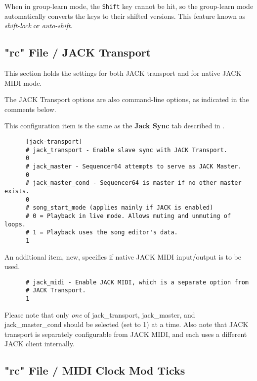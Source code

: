    When in group-learn mode, the \texttt{Shift} key cannot be hit, so the
   group-learn mode automatically converts the keys to their shifted versions.
   This feature known as \textsl{shift-lock} or \textsl{auto-shift}.

\subsection{"rc" File / JACK Transport}
\label{subsec:seq64_rc_file_jack_transport}

   This section holds the settings for both JACK transport and for native JACK
   MIDI mode.

   The JACK Transport options are also command-line options, as indicated in
   the comments below.

   This configuration item is the same as the 
   \textbf{Jack Sync} tab described in
   .

   \begin{verbatim}
      [jack-transport]
      # jack_transport - Enable slave sync with JACK Transport.
      0
      # jack_master - Sequencer64 attempts to serve as JACK Master.
      0
      # jack_master_cond - Sequencer64 is master if no other master exists.
      0
      # song_start_mode (applies mainly if JACK is enabled)
      # 0 = Playback in live mode. Allows muting and unmuting of loops.
      # 1 = Playback uses the song editor's data.
      1
   \end{verbatim}

   An additional item, new, specifies if native JACK MIDI input/output is to be
   used.

   \begin{verbatim}
      # jack_midi - Enable JACK MIDI, which is a separate option from
      # JACK Transport.
      1
   \end{verbatim}

   Please note that only \textsl{one} of
   jack\_transport, jack\_master, and jack\_master\_cond should be selected
   (set to 1) at a time.
   Also note that JACK transport is separately configurable from
   JACK MIDI, and each uses a different JACK client internally.

\subsection{"rc" File / MIDI Clock Mod Ticks}
\label{subsec:seq64_rc_file_midi_cmt}

